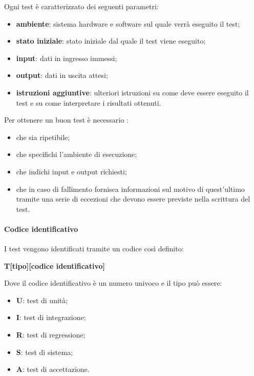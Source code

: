 Ogni test è caratterizzato dei seguenti parametri:
\begin{itemize}
	\item \textbf{ambiente}: sistema hardware e software sul quale verrà eseguito il test;
	\item \textbf{stato iniziale}: stato iniziale dal quale il test viene eseguito;
	\item \textbf{input}: dati in ingresso immessi;
	\item \textbf{output}: dati in uscita attesi; 
	\item\textbf{istruzioni aggiuntive}: ulteriori istruzioni su come deve essere eseguito il test e su come interpretare i risultati ottenuti.
\end{itemize}
Per ottenere un buon test è necessario :
\begin{itemize}
	\item che sia ripetibile;
	\item che specifichi l'ambiente di esecuzione;
	\item che indichi input e output richiesti;
	\item che in caso di fallimento fornisca informazioni sul motivo di quest'ultimo tramite una serie di eccezioni che devono essere previste nella scrittura del test.
\end{itemize}


\paragraph{Codice identificativo}
I test vengono identificati tramite un codice così definito:

\begin{center} \textbf{T[tipo][codice identificativo]} \end{center}

Dove il codice identificativo è un numero univoco e il tipo può essere:
\begin{itemize}
	\item \textbf{U}: test di unità;
	\item \textbf{I}: test di integrazione;
	\item \textbf{R}: test di regressione;
	\item \textbf{S}: test di sistema;
	\item \textbf{A}: test di accettazione.
\end{itemize}

